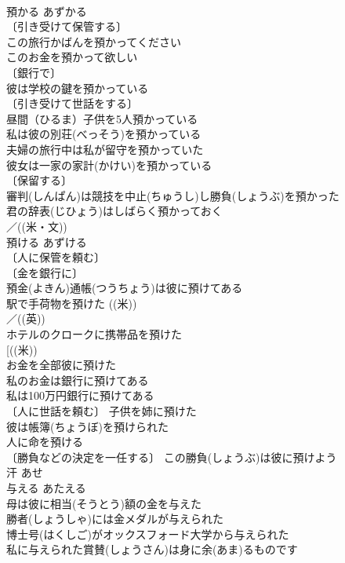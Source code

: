 \documentclass[8pt]{extreport}
\begin{document}
\begin{CJK}{UTF8}{min}
\\	預かる	あずかる	
\\	〔引き受けて保管する〕
\\	この旅行かばんを預かってください 
\\	このお金を預かって欲しい 
\\	〔銀行で〕
\\	彼は学校の鍵を預かっている 
\\	〔引き受けて世話をする〕　
\\	昼間（ひるま）子供を5人預かっている 
\\	私は彼の別荘(べっそう)を預かっている 
\\	夫婦の旅行中は私が留守を預かっていた 
\\	彼女は一家の家計(かけい)を預かっている 
\\	〔保留する〕
\\	審判(しんぱん)は競技を中止(ちゅうし)し勝負(しょうぶ)を預かった 
\\	君の辞表(じひょう)はしばらく預かっておく 
\\	／((米・文)) 
\\	預ける	あずける　
\\	〔人に保管を頼む〕
\\	〔金を銀行に〕
\\	預金(よきん)通帳(つうちょう)は彼に預けてある 
\\	駅で手荷物を預けた ((米)) 
\\	／((英)) 
\\	ホテルのクロークに携帯品を預けた 
\\	[((米))
\\	お金を全部彼に預けた 
\\	私のお金は銀行に預けてある 
\\	私は100万円銀行に預けてある 
\\	〔人に世話を頼む〕 子供を姉に預けた 
\\	彼は帳簿(ちょうぼ)を預けられた 
\\	人に命を預ける 
\\	〔勝負などの決定を一任する〕 この勝負(しょうぶ)は彼に預けよう 
\\	汗	あせ	
\\	与える	あたえる	
\\	母は彼に相当(そうとう)額の金を与えた 
\\	勝者(しょうしゃ)には金メダルが与えられた 
\\	博士号(はくしご)がオックスフォード大学から与えられた 
\\	私に与えられた賞賛(しょうさん)は身に余(あま)るものです 

\end{CJK}
\end{document}
